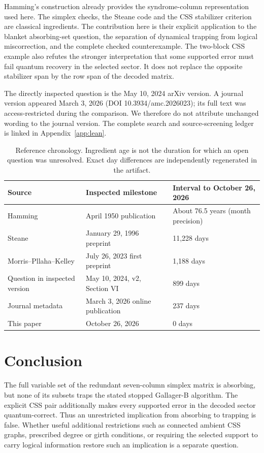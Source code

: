 \documentclass[11pt]{article}
\begin{document}
Hamming's construction \cite{hamming} already provides the syndrome-column
representation used here. The simplex checks, the Steane code and the CSS
stabilizer criterion are classical ingredients. The contribution here is
their explicit application to the blanket absorbing-set question, the
separation of dynamical trapping from logical miscorrection, and the
complete checked counterexample. The two-block CSS example also refutes
the stronger interpretation that some supported error must fail quantum
recovery in the selected sector. It does not replace the opposite
stabilizer span by the row span of the decoded matrix.

The directly inspected question is the May 10, 2024 arXiv version. A journal
version appeared March 3, 2026 (DOI 10.3934/amc.2026023); its full text was
access-restricted during the comparison. We therefore do not attribute
unchanged wording to the journal version. The complete search and
source-screening ledger is linked in Appendix~\ref{app:lean}.

\begin{table}[ht]
\centering\small
\begin{tabular}{p{}p{}p{}}
\toprule Source & Inspected milestone & Interval to October 26, 2026\\
\midrule
Hamming & April 1950 publication & About 76.5 years (month precision)\\
Steane & January 29, 1996 preprint & 11,228 days\\
Morris--Pllaha--Kelley & July 26, 2023 first preprint & 1,188 days\\
Question in inspected version & May 10, 2024, v2, Section VI & 899 days\\
Journal metadata & March 3, 2026 online publication & 237 days\\
This paper & October 26, 2026 & 0 days\\
\bottomrule
\end{tabular}
\caption{Reference chronology. Ingredient age is not the duration for which
an open question was unresolved. Exact day differences are independently
regenerated in the artifact.}
\end{table}

\section{Conclusion}
The full variable set of the redundant seven-column simplex matrix is
absorbing, but none of its subsets traps the stated stopped Gallager-B
algorithm. The explicit CSS pair additionally makes every supported error
in the decoded sector quantum-correct. Thus an unrestricted implication
from absorbing to trapping is false. Whether useful additional restrictions
such as connected ambient CSS graphs, prescribed degree or girth conditions,
or requiring the selected support to carry logical information restore such
an implication is a separate question.
\end{document}
